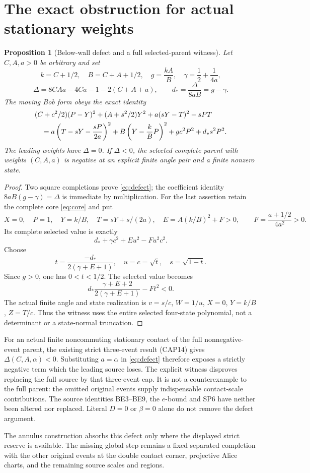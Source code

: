 \documentclass[11pt]{article}
\newtheorem{proposition}[lemma]{Proposition}
\begin{document}
\section*{The exact obstruction for actual stationary weights}

\begin{proposition}[Below-wall defect and a full selected-parent witness]
Let $C,A,a>0$ be arbitrary and set
\[
 k=C+1/2,\quad B=C+A+1/2,\quad
 g=\frac{kA}{B},\quad \gamma=\frac12+\frac1{4a},
\]
\[
 \Delta=8CAa-4Ca-1-2(C+A+a),\qquad
 d_*=\frac{\Delta}{8aB}=g-\gamma.
\]
The moving Bob form obeys the exact identity
\begin{align}
 &(C+c^2/2)(P-Y)^2+(A+s^2/2)Y^2+a(sY-T)^2-sPT\notag\\
 &\quad=a\left(T-sY-\frac{sP}{2a}\right)^2
       +B\left(Y-\frac{k}{B}P\right)^2
       +g c^2P^2+d_*s^2P^2.                    \label{eq:defect}
\end{align}
The leading weights have $\Delta=0$.  If $\Delta<0$, the selected
complete parent with weights $(C,A,a)$ is negative at an explicit
finite angle pair and a finite nonzero state.
\end{proposition}

\begin{proof}
Two square completions prove \eqref{eq:defect}; the coefficient identity
$8aB(g-\gamma)=\Delta$ is immediate by multiplication.
For the last assertion retain the complete core \eqref{eq:core} and put
\[
 X=0,\quad P=1,\quad Y=k/B,\quad
 T=sY+s/(2a),\quad
 E=A(k/B)^2+F>0,\qquad F=\frac{a+1/2}{4a^2}>0.
\]
Its complete selected value is exactly
\[
 d_*+\gamma c^2+Eu^2-Fu^2c^2.
\]
Choose
\[
 t=\frac{-d_*}{2(\gamma+E+1)},\quad
 u=c=\sqrt t,\quad s=\sqrt{1-t}.
\]
Since $g>0$, one has $0<t<1/2$.  The selected value becomes
\[
 d_*\frac{\gamma+E+2}{2(\gamma+E+1)}-Ft^2<0.
\]
The actual finite angle and state realization is
$v=s/c$, $W=1/u$, $X=0$, $Y=k/B$, $Z=T/c$.
Thus the witness uses the entire selected four-state polynomial,
not a determinant or a state-normal truncation.
\end{proof}

For an actual finite noncommuting stationary contact of the full
nonnegative-event parent, the existing strict three-event result
(CAP14) gives $\Delta(C,A,\alpha)<0$.  Substituting $a=\alpha$
in \eqref{eq:defect} therefore exposes a strictly negative term which
the leading source loses.  The explicit witness disproves replacing
the full source by that three-event cap.  It is not a counterexample
to the full parent: the omitted original events supply indispensable
contact-scale contributions.  The source identities BE3--BE9, the
$e$-bound and SP6 have neither been altered nor replaced.  Literal
$D=0$ or $\beta=0$ alone do not remove the defect argument.

The annulus construction absorbs this defect only where the displayed
strict reserve is available.  The missing global step remains a fixed
separated completion with the other original events at the double
contact corner, projective Alice charts, and the remaining source
scales and regions.
\end{document}
